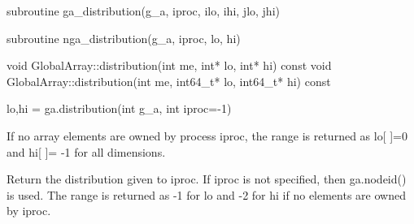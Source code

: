 \documentclass[12pt]{article}
\begin{document}
\begin{f2dapi}
\begin{fcode}
subroutine ga_distribution(g_a, iproc, ilo, ihi, jlo, jhi)
\end{fcode}
\begin{funcargs}
\end{funcargs}
\end{f2dapi}

\begin{fapi}
\begin{fcode}
subroutine nga_distribution(g_a, iproc, lo, hi)
\end{fcode}
\begin{funcargs}
\end{funcargs}
\end{fapi}

\begin{cxxapi}
\begin{cxxcode}
void GlobalArray::distribution(int me, int* lo, int* hi) const
void GlobalArray::distribution(int me, int64_t* lo, int64_t* hi) const
\end{cxxcode}
\begin{funcargs}
\end{funcargs}
\end{cxxapi}

\begin{pyapi}
\begin{pycode}
lo,hi = ga.distribution(int g_a, int iproc=-1)
\end{pycode}
\begin{funcargs}
\end{funcargs}
\end{pyapi}

\local

\begin{desc}

If no array elements are owned by process iproc, the range is returned as
lo[ ]=0 and hi[ ]= -1 for all dimensions.

Return the distribution given to iproc. If iproc is not specified, then
ga.nodeid() is used. The range is returned as -1 for lo and -2 for hi if no
elements are owned by iproc.

\end{desc}
\end{document}
